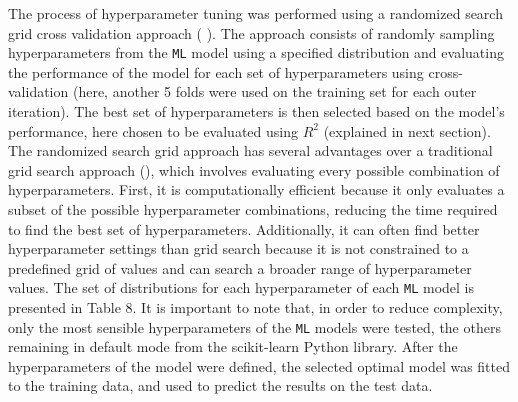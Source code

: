 \documentclass[12pt]{article}
\begin{document}
\par The process of hyperparameter tuning was performed using a randomized search grid cross validation approach (\cite{bergstra2012} ). The approach consists of randomly  sampling hyperparameters from the \texttt{ML} model using a specified distribution and evaluating the performance of the model for each set of hyperparameters using cross-validation (here, another 5 folds were used on the training set for each outer iteration). The best set of hyperparameters is then selected based on the model's performance, here chosen to be evaluated using $R^2$ (explained in next section). The randomized search grid approach has several advantages over a traditional grid search approach (\cite{bergstra2012}), which involves evaluating every possible combination of hyperparameters. First, it is computationally efficient because it only evaluates a subset of the possible hyperparameter combinations, reducing the time required to find the best set of hyperparameters. Additionally, it can often find better hyperparameter settings than grid search because it is not constrained to a predefined grid of values and can search a broader range of hyperparameter values. The set of distributions for each hyperparameter of each \texttt{ML} model is presented in Table 8. It is important to note that, in order to reduce complexity, only the most sensible hyperparameters of the \texttt{ML} models were tested, the others remaining in default mode from the scikit-learn Python library. After the hyperparameters of the model were defined, the selected optimal model was fitted to the training data, and used to predict the results on the test data.
\end{document}
